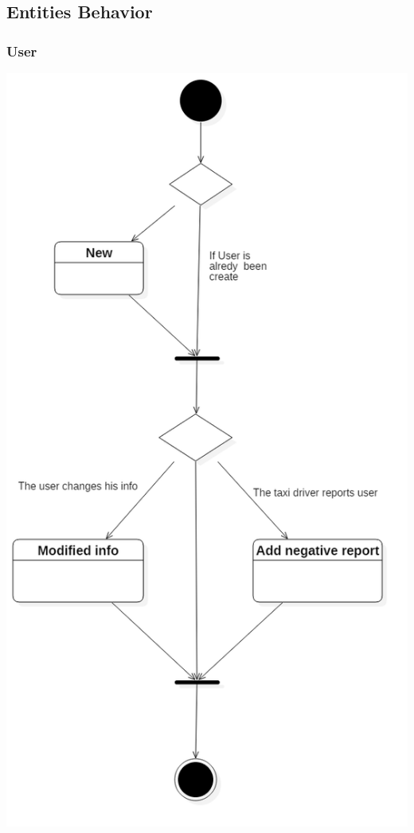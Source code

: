 \documentclass[english]{article}
\begin{document}
\subsection{Entities Behavior}

\subsubsection{User}

\includegraphics[width=\textwidth,height=\textheight,keepaspectratio]{UserBehavior}
\end{document}
